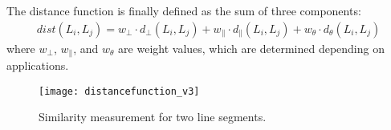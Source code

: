%




The distance function is finally defined as the sum of three components:
\begin{equation}
\label{eq:distancefunction}
\begin{aligned}
dist(L_i, L_j) = w_\bot \cdot d_\bot(L_i, L_j) + w_\parallel \cdot d_\parallel(L_i, L_j) + w_\theta \cdot d_\theta(L_i, L_j)
\end{aligned}
\end{equation}
where $w_\bot$, $w_\parallel$, and $w_\theta$ are weight values, which are determined depending on applications.

\begin{figure}[tb]
	\centering
	\texttt{[image: distancefunction\_v3]}
	\caption{Similarity measurement for two line segments.}
	\label{fig:distancefunction}
\end{figure}

